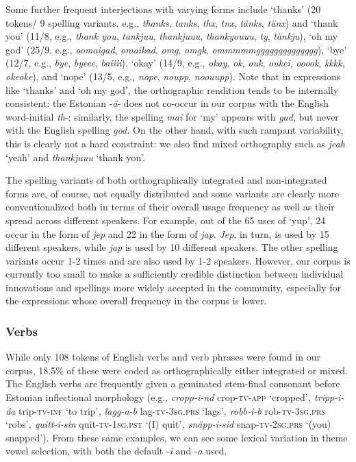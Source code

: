 \documentclass[output=paper]{langscibook}
\begin{document}
Some further frequent interjections with varying forms include ‘thanks’ (20 tokens/ 9 spelling variants, e.g., \textit{thanks}, \textit{tanks}, \textit{thx}, \textit{tnx}, \textit{tänks}, \textit{tänx}) and ‘thank you’ (11/8, e.g., \textit{thank you}, \textit{tankjuu}, \textit{thankjuuu}, \textit{thankyouuu}, \textit{ty}, \textit{tänkju}), ‘oh my god’ (25/9, e.g., \textit{oomaigad}, \textit{omaikad}, \textit{omg}, \textit{omgk}, \textit{ommmmmgggggggggggggg}), ‘bye’ (12/7, e.g., \textit{bye}, \textit{byeee}, \textit{baiiii}), ‘okay’ (14/9, e.g., \textit{okay}, \textit{ok}, \textit{ouk}, \textit{oukei}, \textit{ooook}, \textit{kkkk}, \textit{okeoke}), and ‘nope’ (13/5, e.g., \textit{nope}, \textit{noupp}, \textit{noouupp}). Note that in expressions like ‘thanks’ and ‘oh my god’, the orthographic rendition tends to be internally consistent: the Estonian -\textit{ä}{}- does not co-occur in our corpus with the English word-initial \textit{th}{}-; similarly, the spelling \textit{mai} for ‘my’ appears with \textit{gad}, but never with the English spelling \textit{god.} On the other hand, with such rampant variability, this is clearly not a hard constraint: we also find mixed orthography such as \textit{jeah} ‘yeah’ and \textit{thankjuuu} ‘thank you’.

The spelling variants of both orthographically integrated and non-integrated forms are, of course, not equally distributed and some variants are clearly more conventionalized both in terms of their overall usage frequency as well as their spread across different speakers. For example, out of the 65 uses of ‘yup’, 24 occur in the form of \textit{jep} and 22 in the form of \textit{jap}. \textit{Jep}, in turn, is used by 15 different speakers, while \textit{jap} is used by 10 different speakers. The other spelling variants occur 1-2 times and are also used by 1-2 speakers. However, our corpus is currently too small to make a sufficiently credible distinction between individual innovations and spellings more widely accepted in the community, especially for the expressions whose overall frequency in the corpus is lower.

\subsubsection{Verbs}

While only 108 tokens of English verbs and verb phrases were found in our corpus, 18.5\% of these were coded as orthographically either integrated or mixed. The English verbs are frequently given a geminated stem-final consonant before Estonian inflectional morphology (e.g., \textit{cropp-i-nd} crop{}-\textsc{tv-app} ‘cropped’\textit{, tripp-i-da} trip{}-\textsc{tv-inf} ‘to trip’\textit{, lagg-a-b} lag{}-\textsc{tv-3sg.prs} ‘lags’\textit{, robb-i-b} rob{}-\textsc{tv-3sg.prs} ‘robs’\textit{, quitt-i-sin} quit{}-\textsc{tv-1sg.pst} ‘(I) quit’\textit{, snäpp-i-sid} snap-\textsc{tv-2sg.prs} ‘(you) snapped’). From these same examples, we can see some lexical variation in theme vowel selection, with both the default -\textit{i} and -\textit{a} used.
\end{document}
